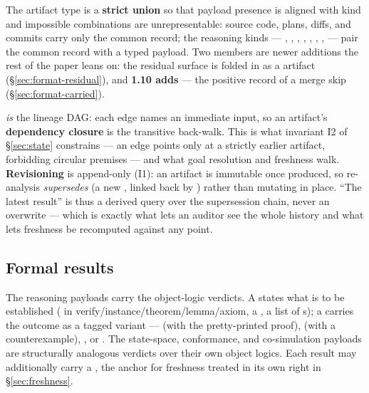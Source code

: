 \begin{sloppypar}
The artifact type is a \textbf{strict union} so that payload presence is aligned with kind and
impossible combinations are unrepresentable: source code, plans, diffs, and commits carry only the
common record; the reasoning kinds --- , ,
, ,
, ,
,  --- pair the common record with a
typed payload. Two members are newer additions the rest of the paper leans on: the residual surface
is folded in as a  artifact (\S\ref{sec:format-residual}), and \textbf{1.10 adds}
 --- the positive record of a merge skip (\S\ref{sec:format-carried}).
\end{sloppypar}

 \emph{is} the lineage DAG: each edge names an immediate input, so an artifact's
\textbf{dependency closure} is the transitive back-walk. This is what invariant I2 of
\S\ref{sec:state} constrains --- an edge points only at a strictly earlier artifact, forbidding
circular premises --- and what goal resolution and freshness walk. \textbf{Revisioning} is
append-only (I1): an artifact is immutable once produced, so re-analysis \emph{supersedes} (a new
, linked back by ) rather than mutating in place. ``The latest
result'' is thus a derived query over the supersession chain, never an overwrite --- which is exactly
what lets an auditor see the whole history and what lets freshness be recomputed against any point.

\subsection{Formal results}\label{sec:format-results}

The reasoning payloads carry the object-logic verdicts. A  states what is to
be established ( in verify/instance/theorem/lemma/axiom, a , a
list of s); a  carries the outcome as a tagged variant
---  (with the pretty-printed proof),  (with a
counterexample), , or . The state-space, conformance, and
co-simulation payloads are structurally analogous verdicts over their own object logics. Each result may
additionally carry a , the anchor for freshness treated in its own right in
\S\ref{sec:freshness}.

